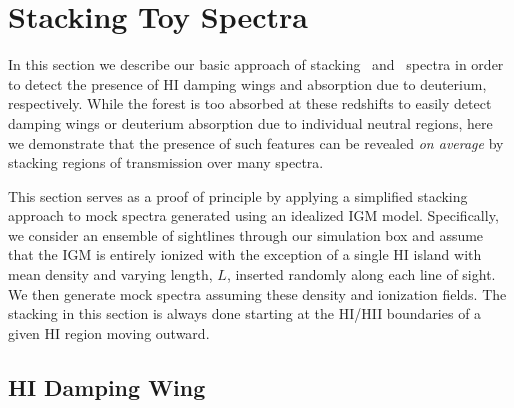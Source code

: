 \section{Stacking Toy Spectra} \label{sec:Stacking}


In this section we describe our basic approach of stacking \lya\ and \lyb\ spectra in order to detect the presence of HI damping wings and absorption due to deuterium, respectively. While the forest is too absorbed at these redshifts to easily detect damping wings or deuterium absorption due to individual neutral regions, here we demonstrate that the presence of such features can be revealed \textit{on average} by stacking regions of transmission over many spectra.
 
 
This section serves as a proof of principle by applying a simplified stacking approach to mock spectra generated using an idealized IGM model. Specifically, we consider an ensemble of sightlines through our simulation box and assume that the IGM is entirely ionized with the exception of a single HI island with mean density and varying length, $L$, inserted randomly along each line of sight. We then generate mock spectra assuming these density and ionization fields. The stacking in this section is always done starting at the HI/HII boundaries of a given HI region moving outward.




\subsection{HI Damping Wing} \label{sec:ToyHI}



